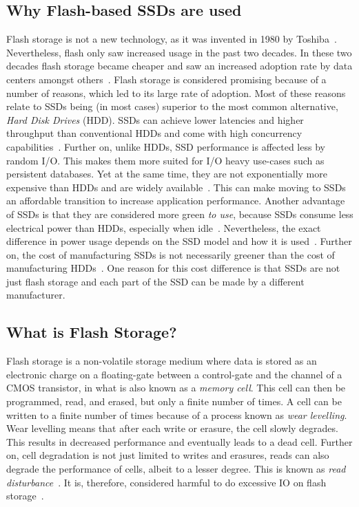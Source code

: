 \subsection{Why Flash-based SSDs are used}
Flash storage is not a new technology, as it was invented in 1980 by Toshiba~\cite{klein2016history}. Nevertheless, flash only saw increased usage in the past two decades. In these two decades flash storage became cheaper and saw an increased adoption rate by data centers amongst others~\cite{lee2008case, andersen2010rethinking}. Flash storage is considered promising because of a number of reasons, which led to its large rate of adoption. Most of these reasons relate to SSDs being (in most cases) superior to the most common alternative, \textit{Hard Disk Drives} (HDD). SSDs can achieve lower latencies and higher throughput than conventional HDDs and come with high concurrency capabilities~\cite{athanassoulis2010flash, rizvi2010flash, ajwani2008characterizing}. Further on, unlike HDDs, SSD performance is affected less by random I/O.  This makes them more suited for I/O heavy use-cases such as persistent databases. Yet at the same time, they are not exponentially more expensive than HDDs and are widely available~\cite{grupp2012bleak}. This can make moving to SSDs an affordable transition to increase application performance. Another advantage of SSDs is that they are considered more green \textit{to use}, because SSDs consume less electrical power than HDDs, especially when idle~\cite{andersen2010rethinking, dayarathna2015data}. Nevertheless, the exact difference in power usage depends on the SSD model and how it is used~\cite{dayarathna2015data}. Further on, the cost of manufacturing SSDs is not necessarily greener than the cost of manufacturing HDDs~\cite{tannu2022dirty}. One reason for this cost difference is that SSDs are not just flash storage and each part of the SSD can be made by a different manufacturer. 


\subsection{What is Flash Storage?}
Flash storage is a non-volatile storage medium where data is stored as an electronic charge on a floating-gate between a control-gate and the channel of a CMOS transistor, in what is also known as a \textit{memory cell}. This cell can then be programmed, read, and erased, but only a finite number of times. A cell can be written to a finite number of times because of a process known as \textit{wear levelling}. Wear levelling means that after each write or erasure, the cell slowly degrades. This results in decreased performance and eventually leads to a dead cell. Further on, cell degradation is not just limited to writes and erasures, reads can also degrade the performance of cells, albeit to a lesser degree. This is known as \textit{read disturbance}~\cite{liu2015read}. It is, therefore, considered harmful to do excessive IO on flash storage~\cite{min2012sfs}. 

